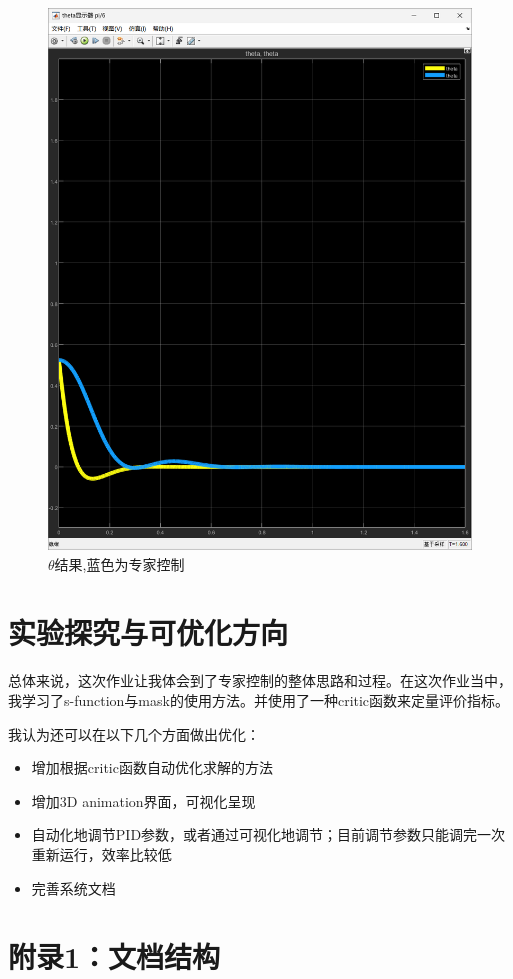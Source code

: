 \documentclass[12pt,a4paper,UTF8]{article}
\begin{document}
\begin{figure}[!htbp]
    \begin{minipage}[b]{0.45\linewidth}
        \centering
        \includegraphics[width=0.7\linewidth]{figures/theta_3.png}
    \caption{$\theta$结果,蓝色为专家控制}
    \end{minipage}%
\end{figure}

\section{实验探究与可优化方向}

总体来说，这次作业让我体会到了专家控制的整体思路和过程。在这次作业当中，我学习了s-function与mask的使用方法。并使用了一种critic函数来定量评价指标。

我认为还可以在以下几个方面做出优化：

\begin{itemize}
    \item 增加根据critic函数自动优化求解的方法
    \item 增加3D animation界面，可视化呈现
    \item 自动化地调节PID参数，或者通过可视化地调节；目前调节参数只能调完一次重新运行，效率比较低
    \item 完善系统文档
\end{itemize}


\clearpage
\appendix

\section{附录1：文档结构}
\end{document}
